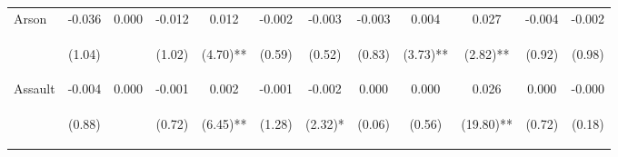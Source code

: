 \begin{tabular}{lccccccccccc}
\noalign{\smallskip}Arson & -0.036 & 0.000 & -0.012 & 0.012 & -0.002 & -0.003 & -0.003 & 0.004 & 0.027 & -0.004 & -0.002\\
 & \begin{footnotesize}(1.04)\end{footnotesize} & \begin{footnotesize}\end{footnotesize} & \begin{footnotesize}(1.02)\end{footnotesize} & \begin{footnotesize}(4.70)**\end{footnotesize} & \begin{footnotesize}(0.59)\end{footnotesize} & \begin{footnotesize}(0.52)\end{footnotesize} & \begin{footnotesize}(0.83)\end{footnotesize} & \begin{footnotesize}(3.73)**\end{footnotesize} & \begin{footnotesize}(2.82)**\end{footnotesize} & \begin{footnotesize}(0.92)\end{footnotesize} & \begin{footnotesize}(0.98)\end{footnotesize}\\
\noalign{\smallskip}Assault & -0.004 & 0.000 & -0.001 & 0.002 & -0.001 & -0.002 & 0.000 & 0.000 & 0.026 & 0.000 & -0.000\\
 & \begin{footnotesize}(0.88)\end{footnotesize} & \begin{footnotesize}\end{footnotesize} & \begin{footnotesize}(0.72)\end{footnotesize} & \begin{footnotesize}(6.45)**\end{footnotesize} & \begin{footnotesize}(1.28)\end{footnotesize} & \begin{footnotesize}(2.32)*\end{footnotesize} & \begin{footnotesize}(0.06)\end{footnotesize} & \begin{footnotesize}(0.56)\end{footnotesize} & \begin{footnotesize}(19.80)**\end{footnotesize} & \begin{footnotesize}(0.72)\end{footnotesize} & \begin{footnotesize}(0.18)\end{footnotesize}\\

\end{tabular}
